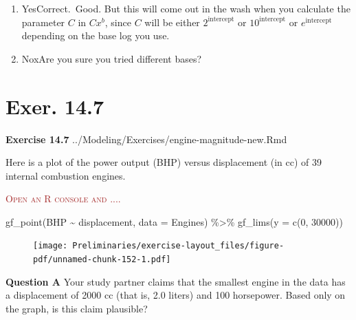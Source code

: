 \documentclass[
  letterpaper,
  DIV=11,
  numbers=noendperiod,
  oneside]{article}
\newenvironment{Shaded}{\begin{snugshade}}{\end{snugshade}}
\newcommand{\AttributeTok}[1]{\textcolor[rgb]{0.40,0.45,0.13}{#1}}
\newcommand{\DecValTok}[1]{\textcolor[rgb]{0.68,0.00,0.00}{#1}}
\newcommand{\FunctionTok}[1]{\textcolor[rgb]{0.28,0.35,0.67}{#1}}
\newcommand{\NormalTok}[1]{\textcolor[rgb]{0.00,0.23,0.31}{#1}}
\newcommand{\SpecialCharTok}[1]{\textcolor[rgb]{0.37,0.37,0.37}{#1}}
\providecommand{\tightlist}{%
  \setlength{\itemsep}{0pt}\setlength{\parskip}{0pt}}\usepackage{longtable,booktabs,array}
\newenvironment{scaffolding}%
{%
\textcolor{brown}{\hrulefill}%
  \par\vspace{.3\baselineskip}%
  \textcolor{brown}{\scshape Open an R console and ....}%
  \par\vspace{\baselineskip}%
}%
{\textcolor{brown}{\hrulefill}}
\begin{document}
\begin{multicols}{2}
\begin{enumerate}
\def\labelenumi{\roman{enumi}.}
\tightlist
\item
  {Yes{Correct.~Good. But this will come out in the wash when you
  calculate the parameter \(C\) in \(C x^b\), since \(C\) will be either
  \(2^\text{intercept}\) or \(10^\text{intercept}\) or
  \(e^\text{intercept}\) depending on the base log you use.}}\\
\item
  {No{xAre you sure you tried different bases?}}
\end{enumerate}

\hypertarget{exer.-14.7}{%
\section*{Exer. 14.7}\label{exer.-14.7}}

\textbf{Exercise 14.7} ../Modeling/Exercises/engine-magnitude-new.Rmd

Here is a plot of the power output (BHP) versus displacement (in cc) of
39 internal combustion engines.

\begin{scaffolding}

\begin{Shaded}
\begin{Highlighting}[]
\FunctionTok{gf\_point}\NormalTok{(BHP }\SpecialCharTok{\textasciitilde{}}\NormalTok{ displacement, }\AttributeTok{data =}\NormalTok{ Engines) }\SpecialCharTok{\%\textgreater{}\%}
  \FunctionTok{gf\_lims}\NormalTok{(}\AttributeTok{y  =} \FunctionTok{c}\NormalTok{(}\DecValTok{0}\NormalTok{, }\DecValTok{30000}\NormalTok{))}
\end{Highlighting}
\end{Shaded}

\begin{figure}[H]

{\centering \texttt{[image: Preliminaries/exercise-layout\_files/figure-pdf/unnamed-chunk-152-1.pdf]}

}

\end{figure}

\end{scaffolding}

\textbf{Question A} Your study partner claims that the smallest engine
in the data has a displacement of 2000 cc (that is, 2.0 liters) and 100
horsepower. Based only on the graph, is this claim plausible?


\end{multicols}
\end{document}
